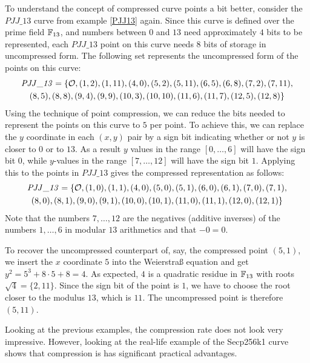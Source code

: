 \begin{example} To understand the concept of compressed curve points a bit better, consider the $\mathit{PJJ\_13}$ curve from example \ref{PJJ13} again. Since this curve is defined over the prime field $\mathbb{F}_{13}$, and numbers between $0$ and $13$ need approximately $4$ bits to be represented, each $\mathit{PJJ\_13}$ point on this curve needs $8$ bits of storage in uncompressed form. The following set represents the uncompressed form of the points on this curve:
\begin{multline*}
\mathit{PJJ\_13} = \{\mathcal{O}, (1, 2), (1, 11), (4, 0), (5, 2), (5, 11), (6, 5), (6, 8), (7,2), (7, 11), \\ (8, 5), (8, 8), (9, 4), (9, 9), (10, 3), (10,
10), (11, 6), (11, 7), (12, 5), (12, 8)\}
\end{multline*}
Using the technique of point compression, we can reduce the bits needed to represent the points on this curve to  $5$ per point. To achieve this, we can replace the $y$ coordinate in each $(x,y)$ pair by a sign bit indicating whether or not $y$ is closer to $0$ or to $13$. As a result $y$ values in the range $[0,\ldots,6]$ will have the sign bit $0$, while $y$-values in the range $[7,\ldots,12]$ will have the sign bit $1$. Applying this to the points in $\mathit{PJJ\_13}$ gives the compressed representation as follows:
\begin{multline*}
\mathit{PJJ\_13} = \{\mathcal{O}, (1, 0), (1, 1), (4, 0), (5, 0), (5, 1), (6, 0), (6, 1), (7,0), (7, 1), \\ (8, 0), (8, 1), (9, 0), (9, 1), (10, 0), (10,1), (11, 0), (11, 1), (12, 0), (12, 1)\}
\end{multline*} 
Note that the numbers $7,\ldots, 12$ are the negatives (additive inverses) of the numbers $1,\ldots, 6$ in modular $13$ arithmetics and that $-0=0$. 

To recover the uncompressed counterpart of, say, the compressed point $(5,1)$, we insert the $x$ coordinate $5$ into the Weierstraß equation and get $y^2 = 5^3 + 8\cdot 5 +8 = 4$. As expected, $4$ is a quadratic residue in $\mathbb{F}_{13}$ with roots $\sqrt{4}= \{2,11\}$. Since the sign bit of the point is $1$, we have to choose the root closer to the modulus $13$, which is $11$. The uncompressed point is therefore $(5,11)$. 
\end{example}
Looking at the previous examples, the compression rate does not look very impressive. However, looking at the real-life example of the Secp256k1 curve shows that compression is has significant practical advantages.
